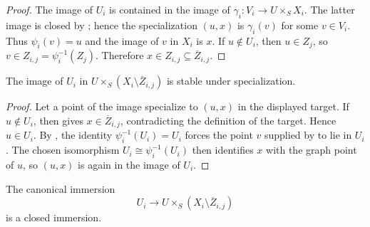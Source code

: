 \begin{proof}
  \leanok
  The image of $U_i$ is contained in the image of
  $\gamma_i\colon V_i\to U\times_SX_i$.  The latter image is closed by
  ; hence the specialization
  $(u,x)$ is $\gamma_i(v)$ for some $v\in V_i$.  Thus
  $\psi_i(v)=u$ and the image of $v$ in $X_i$ is $x$.  If $u\notin U_i$, then
  $u\in Z_j$, so $v\in Z_{i,j}=\psi_i^{-1}(Z_j)$.  Therefore
  $x\in Z_{i,j}\subseteq\overline Z_{i,j}$.
\end{proof}

\begin{lemma}
  \label{lemma:nagata-intermediate-overlap-specialization-closed}
  \leanok

  The image of $U_i$ in
  $U\times_S(X_i\setminus\overline Z_{i,j})$ is stable under specialization.
\end{lemma}

\begin{proof}
  \leanok
  Let a point of the image specialize to $(u,x)$ in the displayed target.  If
  $u\notin U_i$, then
   gives
  $x\in\overline Z_{i,j}$, contradicting the definition of the target.
  Hence $u\in U_i$.  By
  , the identity
  $\psi_i^{-1}(U_i)=U_i$ forces the point $v$ supplied by
   to lie in $U_i$.
  The chosen isomorphism $U_i\cong\psi_i^{-1}(U_i)$ then identifies $x$ with
  the graph point of $u$, so $(u,x)$ is again in the image of $U_i$.
\end{proof}

\begin{lemma}
  \label{lemma:nagata-intermediate-overlap-closed}
  \leanok

  The canonical immersion
  \[
    U_i\longrightarrow
    U\times_S(X_i\setminus\overline Z_{i,j})
  \]
  is a closed immersion.
\end{lemma}

